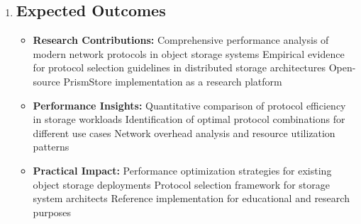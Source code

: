\documentclass[12pt]{article}
\begin{document}
\begin{enumerate}
\begin{itemize}
        Develop the PrismStore kernel with modular network protocol support, ensuring consistent functionality across all protocol implementations.
        \item \textbf{ Phase 2: Baseline Establishment}
    
        Deploy PrismStore with HTTP/2 configuration and benchmark against MinIO object storage system to establish credibility and performance baselines.
        \item \textbf{ Phase 3: Protocol Evaluation}
            \begin{itemize}
                \item Step 1: Client Communication Analysis
                    Compare HTTP/2 vs. HTTP/3 for client-server interactions
                    Measure throughput, latency, and resource utilization

                \item Step 2: Inter-Node Communication Analysis
                    Evaluate protocol impact on worker-master node coordination
                    Assess scalability and fault tolerance characteristics

                \item Step 3: Cross-Protocol Evaluation
                    Test gRPC for both communication channels
                    Analyze performance against HTTP-based protocols
            \end{itemize}

        \item \textbf{ Phase 4: Optimization and Configuration Selection}
    
            Systematically evaluate all possible protocol combinations to identify the optimal configuration for different workload patterns and network conditions.
    \end{itemize}

    \item \subsection*{Expected Outcomes}
        \begin{itemize}
            \item \textbf {Research Contributions:} Comprehensive performance analysis of modern network protocols in object storage systems
            Empirical evidence for protocol selection guidelines in distributed storage architectures
            Open-source PrismStore implementation as a research platform
            \item \textbf {Performance Insights:} Quantitative comparison of protocol efficiency in storage workloads
            Identification of optimal protocol combinations for different use cases
            Network overhead analysis and resource utilization patterns
            \item \textbf {Practical Impact:} Performance optimization strategies for existing object storage deployments
            Protocol selection framework for storage system architects
            Reference implementation for educational and research purposes
        \end{itemize}


\end{enumerate}
\end{document}
